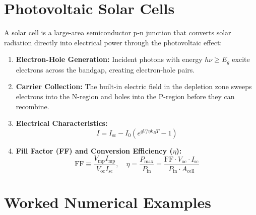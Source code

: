 \section{Photovoltaic Solar Cells}
A solar cell is a large-area semiconductor p-n junction that converts solar radiation directly into electrical power through the photovoltaic effect:
\begin{enumerate}[leftmargin=*,itemsep=2pt]
    \item \textbf{Electron-Hole Generation:} Incident photons with energy $h\nu \ge E_g$ excite electrons across the bandgap, creating electron-hole pairs.
    \item \textbf{Carrier Collection:} The built-in electric field in the depletion zone sweeps electrons into the N-region and holes into the P-region before they can recombine.
    \item \textbf{Electrical Characteristics:}
    \begin{equation}
    I = I_{\text{sc}} - I_0 \left( e^{qV / \eta k_B T} - 1 \right)
    \end{equation}
    \item \textbf{Fill Factor (FF) and Conversion Efficiency ($\eta$):}
    \begin{equation}
    \text{FF} \equiv \frac{V_{\text{mp}} I_{\text{mp}}}{V_{\text{oc}} I_{\text{sc}}}, \quad \eta = \frac{P_{\text{max}}}{P_{\text{in}}} = \frac{\text{FF} \cdot V_{\text{oc}} \cdot I_{\text{sc}}}{P_{\text{in}} \cdot A_{\text{cell}}}
    \end{equation}
\end{enumerate}

\section{Worked Numerical Examples}

